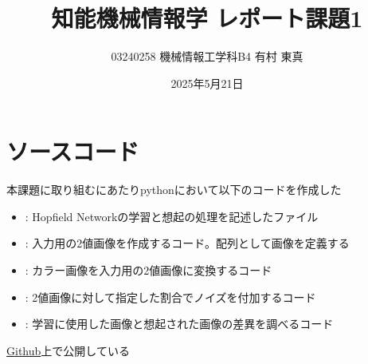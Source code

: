 \documentclass{ltjsarticle}
\title{知能機械情報学 レポート課題1}
\author{03240258 機械情報工学科B4 有村 東真}
\date{2025年5月21日}
\begin{document}
\maketitle
\newpage

\setcounter{tocdepth}{3}
\tableofcontents %

\newpage
\section{ソースコード}
本課題に取り組むにあたりpythonにおいて以下のコードを作成した
\begin{itemize}
  \item {}: Hopfield Networkの学習と想起の処理を記述したファイル
  \item {}: 入力用の2値画像を作成するコード。配列として画像を定義する
  \item {}: カラー画像を入力用の2値画像に変換するコード
  \item {}: 2値画像に対して指定した割合でノイズを付加するコード
  \item {}: 学習に使用した画像と想起された画像の差異を調べるコード
\end{itemize}
\href{https://github.com/ankorom0tim0ti/HopfieldNetwork}{Github}上で公開している
\end{document}
